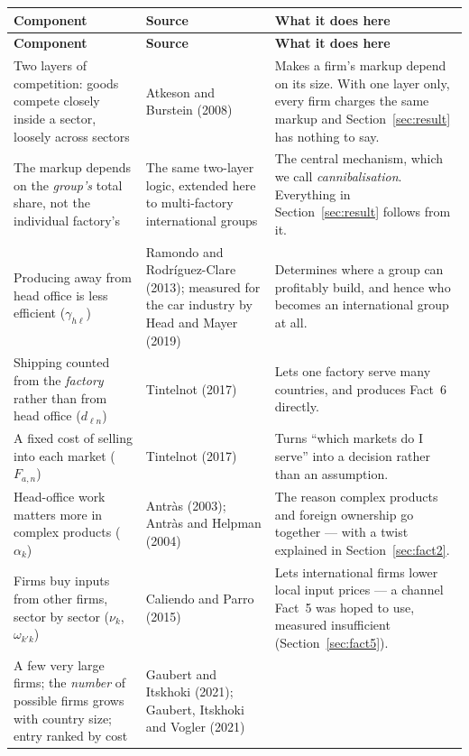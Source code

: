 \documentclass[11pt]{article}
\theoremstyle{plain}
\theoremstyle{remark}
\theoremstyle{definition}
\begin{document}
\begin{center}
\small
\begin{longtable}{p{4.1cm}p{4.5cm}p{5.8cm}}
\toprule
\textbf{Component} & \textbf{Source} & \textbf{What it does here}\\
\midrule
\endfirsthead
\toprule
\textbf{Component} & \textbf{Source} & \textbf{What it does here}\\
\midrule
\endhead
Two layers of competition: goods compete closely inside a sector, loosely across
sectors &
Atkeson and Burstein (2008) &
Makes a firm's markup depend on its size. With one layer only, every firm charges the
same markup and Section~\ref{sec:result} has nothing to say.\\
\addlinespace
The markup depends on the \emph{group's} total share, not the individual factory's &
The same two-layer logic, extended here to multi-factory international groups &
The central mechanism, which we call \emph{cannibalisation}. Everything in Section~\ref{sec:result}
follows from it.\\
\addlinespace
Producing away from head office is less efficient ($\gamma_{h\ell}$) &
Ramondo and Rodr\'iguez-Clare (2013); measured for the car industry by Head and Mayer
(2019) &
Determines where a group can profitably build, and hence who becomes an international
group at all.\\
\addlinespace
Shipping counted from the \emph{factory} rather than from head office ($d_{\ell n}$)
&
Tintelnot (2017) &
Lets one factory serve many countries, and produces Fact~6 directly.\\
\addlinespace
A fixed cost of selling into each market ($F_{a,n}$) &
Tintelnot (2017) &
Turns ``which markets do I serve'' into a decision rather than an assumption.\\
\addlinespace
Head-office work matters more in complex products ($\alpha_k$) &
Antr\`as (2003); Antr\`as and Helpman (2004) &
The reason complex products and foreign ownership go together --- with a twist
explained in Section~\ref{sec:fact2}.\\
\addlinespace
Firms buy inputs from other firms, sector by sector ($\nu_k$, $\omega_{k'k}$) &
Caliendo and Parro (2015) &
Lets international firms lower local input prices --- a channel Fact~5 was hoped to
use, measured insufficient (Section~\ref{sec:fact5}).\\
\addlinespace
A few very large firms; the \emph{number} of possible firms grows with country size;
entry ranked by cost &
Gaubert and Itskhoki (2021); Gaubert, Itskhoki and Vogler (2021) &

\end{longtable}
\end{center}
\end{document}
